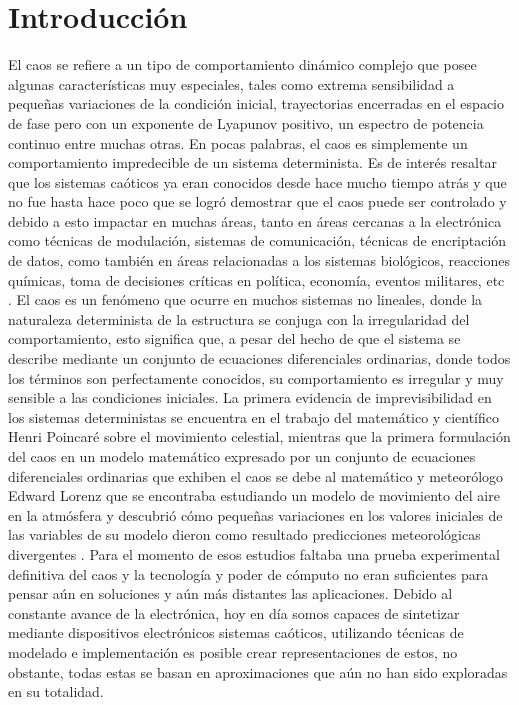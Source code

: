 \chapter{Introducción}
	
	El caos se refiere a un tipo de comportamiento dinámico complejo que posee algunas características muy especiales, tales como extrema sensibilidad a pequeñas variaciones de la condición inicial, trayectorias encerradas en el espacio de fase pero con un exponente de Lyapunov positivo, un espectro de potencia continuo entre muchas otras. En pocas palabras, el caos es simplemente un comportamiento impredecible de un sistema determinista. Es de interés resaltar que los sistemas caóticos ya eran conocidos desde hace mucho tiempo atrás y que no fue hasta hace poco que se logró demostrar que el caos puede ser controlado y debido a esto impactar en muchas áreas, tanto en áreas cercanas a la electrónica como técnicas de modulación, sistemas de comunicación, técnicas de encriptación de datos, como también en áreas  relacionadas a los sistemas biológicos, reacciones químicas, toma de decisiones críticas en política, economía, eventos militares, etc  \cite{Munoz-Pacheco2010}. El caos es un fenómeno que ocurre en muchos sistemas no lineales, donde la naturaleza determinista de la estructura se conjuga con la irregularidad del comportamiento, esto significa que, a pesar del hecho de que el sistema se describe mediante un conjunto de ecuaciones diferenciales ordinarias, donde todos los términos son perfectamente conocidos, su comportamiento es irregular y muy sensible a las condiciones iniciales. La primera evidencia de imprevisibilidad en los sistemas deterministas se encuentra en el trabajo del matemático y científico Henri Poincaré sobre el movimiento celestial, mientras que la primera formulación del caos en un modelo matemático expresado por un conjunto de ecuaciones diferenciales ordinarias que exhiben el caos se debe al matemático y meteorólogo Edward Lorenz que se encontraba estudiando un modelo de movimiento del aire en la atmósfera y descubrió cómo pequeñas variaciones en los valores iniciales de las variables de su modelo dieron como resultado predicciones meteorológicas divergentes \cite{Buscarino2014}. Para el momento de esos estudios faltaba una prueba experimental definitiva del caos y la tecnología y poder de cómputo no eran suficientes para pensar aún en soluciones y aún más distantes las aplicaciones. Debido al constante avance de la electrónica, hoy en día somos capaces de sintetizar mediante dispositivos electrónicos sistemas caóticos, utilizando técnicas de modelado e implementación es posible crear representaciones de estos, no obstante, todas estas se basan en aproximaciones que aún no han sido exploradas en su totalidad. 
